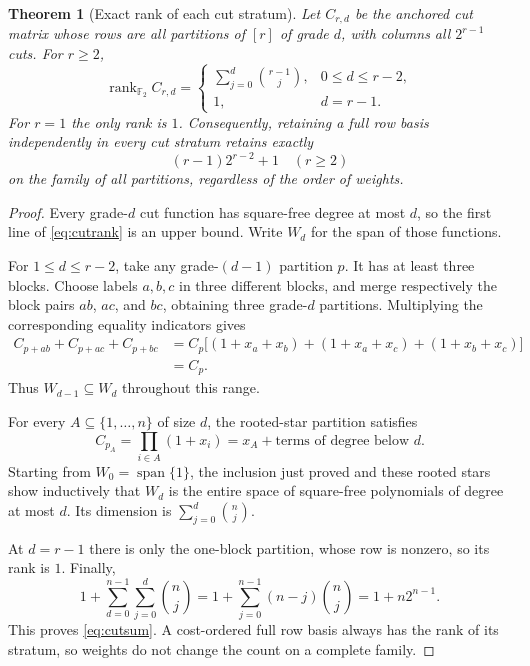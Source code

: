 \documentclass[11pt,a4paper]{article}
\newtheorem{theorem}{Theorem}[section]
\theoremstyle{remark}\newtheorem{remark}[theorem]{Remark}
\newcommand{\F}{\mathbb F_2}
\newcommand{\rank}{\operatorname{rank}}
\newcommand{\Span}{\operatorname{span}}
\begin{document}
\begin{theorem}[Exact rank of each cut stratum]\label{thm:cutrank}
Let $C_{r,d}$ be the anchored cut matrix whose rows are all partitions of $[r]$ of grade $d$, with columns all $2^{r-1}$ cuts. For $r\ge2$,
\begin{equation}\label{eq:cutrank}
 \rank_{\F}C_{r,d}=
 \begin{cases}
 \displaystyle\sum_{j=0}^{d}\binom{r-1}{j},&0\le d\le r-2,\\[2mm]
 1,&d=r-1.
 \end{cases}
\end{equation}
For $r=1$ the only rank is $1$. Consequently, retaining a full row basis independently in every cut stratum retains exactly
\begin{equation}\label{eq:cutsum}
 (r-1)2^{r-2}+1\quad (r\ge2)
\end{equation}
on the family of all partitions, regardless of the order of weights.
\end{theorem}
\begin{proof}
Every grade-$d$ cut function has square-free degree at most $d$, so the first line of \eqref{eq:cutrank} is an upper bound. Write $W_d$ for the span of those functions.

For $1\le d\le r-2$, take any grade-$(d-1)$ partition $p$. It has at least three blocks. Choose labels $a,b,c$ in three different blocks, and merge respectively the block pairs $ab$, $ac$, and $bc$, obtaining three grade-$d$ partitions. Multiplying the corresponding equality indicators gives
\begin{align*}
 C_{p+ab}+C_{p+ac}+C_{p+bc}
 &=C_p\bigl[(1+x_a+x_b)+(1+x_a+x_c)+(1+x_b+x_c)\bigr]\\
 &=C_p.
\end{align*}
Thus $W_{d-1}\subseteq W_d$ throughout this range.

For every $A\subseteq\{1,\ldots,n\}$ of size $d$, the rooted-star partition satisfies
\[
 C_{p_A}=\prod_{i\in A}(1+x_i)=x_A+\text{terms of degree below }d.
\]
Starting from $W_0=\Span\{1\}$, the inclusion just proved and these rooted stars show inductively that $W_d$ is the entire space of square-free polynomials of degree at most $d$. Its dimension is $\sum_{j=0}^d\binom nj$.

At $d=r-1$ there is only the one-block partition, whose row is nonzero, so its rank is $1$. Finally,
\[
 1+\sum_{d=0}^{n-1}\sum_{j=0}^{d}\binom nj
 =1+\sum_{j=0}^{n-1}(n-j)\binom nj
 =1+n2^{n-1}.
\]
This proves \eqref{eq:cutsum}. A cost-ordered full row basis always has the rank of its stratum, so weights do not change the count on a complete family.
\end{proof}
\end{document}
